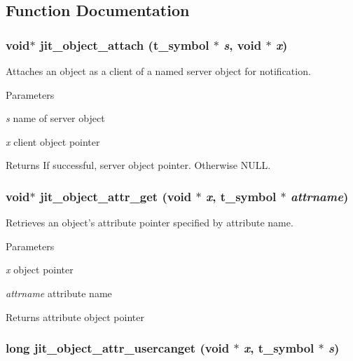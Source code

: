 \subsection{Function Documentation}
\hypertarget{group__objectmod_ga213166e8beeb29aca36c57cd07c722f1}{
\subsubsection[{jit\_\-object\_\-attach}]{\setlength{\rightskip}{0pt plus 5cm}void$\ast$ jit\_\-object\_\-attach ({\bf t\_\-symbol} $\ast$ {\em s}, \/  void $\ast$ {\em x})}}
\label{group__objectmod_ga213166e8beeb29aca36c57cd07c722f1}


Attaches an object as a client of a named server object for notification. 
\begin{DoxyParams}{Parameters}
\item[{\em s}]name of server object \item[{\em x}]client object pointer\end{DoxyParams}
\begin{DoxyReturn}{Returns}
If successful, server object pointer. Otherwise NULL. 
\end{DoxyReturn}
\hypertarget{group__objectmod_ga6d62c09fe37fc74bcaaa6ab326064b6f}{
\subsubsection[{jit\_\-object\_\-attr\_\-get}]{\setlength{\rightskip}{0pt plus 5cm}void$\ast$ jit\_\-object\_\-attr\_\-get (void $\ast$ {\em x}, \/  {\bf t\_\-symbol} $\ast$ {\em attrname})}}
\label{group__objectmod_ga6d62c09fe37fc74bcaaa6ab326064b6f}


Retrieves an object's attribute pointer specified by attribute name. 
\begin{DoxyParams}{Parameters}
\item[{\em x}]object pointer \item[{\em attrname}]attribute name\end{DoxyParams}
\begin{DoxyReturn}{Returns}
attribute object pointer 
\end{DoxyReturn}
\hypertarget{group__objectmod_ga03b2bb6645b076c4afbba3efbd5f14b9}{
\subsubsection[{jit\_\-object\_\-attr\_\-usercanget}]{\setlength{\rightskip}{0pt plus 5cm}long jit\_\-object\_\-attr\_\-usercanget (void $\ast$ {\em x}, \/  {\bf t\_\-symbol} $\ast$ {\em s})}}
\label{group__objectmod_ga03b2bb6645b076c4afbba3efbd5f14b9}


